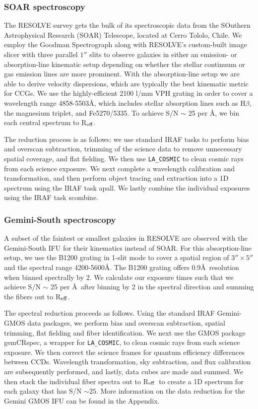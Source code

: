 \documentclass[iop,apj]{emulateapj}
\newcommand{\Reff}{R$_{\rm eff}$}
\begin{document}
\subsubsection{SOAR spectroscopy}
\noindent The RESOLVE survey gets the bulk of its spectroscopic data from the SOuthern Astrophysical Research (SOAR) Telescope, located at Cerro Tololo, Chile. We employ the Goodman Spectrograph \citep{Clemens2004} along with RESOLVE's custom-built image slicer with three parallel $1''$ slits to observe galaxies in either an emission- or absorption-line kinematic setup depending on whether the stellar continuum or gas emission lines are more prominent. With the absorption-line setup we are able to derive velocity dispersions, which are typically the best kinematic metric for CCGs. We use the highly-efficient 2100 l/mm VPH grating in order to cover a wavelength range 4858-5503\AA, which includes stellar absorption lines such as H$\beta$, the magnesium triplet, and Fe5270/5335. To achieve S/N $\sim$ 25 per \AA, we bin each central spectrum to \Reff.

The reduction process is as follows: we use standard IRAF tasks to perform bias and overscan subtraction, trimming of the science data to remove unnecessary spatial coverage, and flat fielding. We then use \texttt{LA\_COSMIC} \citep{vanDokkum2001} to clean cosmic rays from each science exposure. We next complete a wavelength calibration and transformation, and then perform object tracing and extraction into a 1D spectrum using the IRAF task apall. We lastly combine the individual exposures using the IRAF task scombine.

\subsubsection{Gemini-South spectroscopy}

\noindent A subset of the faintest or smallest galaxies in RESOLVE are observed with the Gemini-South IFU for their kinematics instead of SOAR. For this absorption-line setup, we use the B1200 grating in 1-slit mode to cover a spatial region of $3''\times5''$ and the spectral range 4200-5600\AA. The B1200 grating offers 0.9\AA\ resolution when binned spectrally by 2. We calculate our exposure times such that we achieve S/N $\sim$ 25 per \AA\, after binning by 2 in the spectral direction and summing the fibers out to \Reff.

The spectral reduction proceeds as follows. Using the standard IRAF Gemini-GMOS data packages, we perform bias and overscan subtraction, spatial trimming, flat fielding and fiber identification. We next use the GMOS package gemCRspec, a wrapper for \texttt{LA\_COSMIC}, to clean cosmic rays from each science exposure. We then correct the science frames for quantum efficiency differences between CCDs. Wavelength transformation, sky subtraction, and flux calibration are subsequently performed, and lastly, data cubes are made and summed. We then stack the individual fiber spectra out to \Reff\ to create a 1D spectrum for each galaxy that has S/N $\sim25$. More information on the data reduction for the Gemini GMOS IFU can be found in the Appendix.
\end{document}

